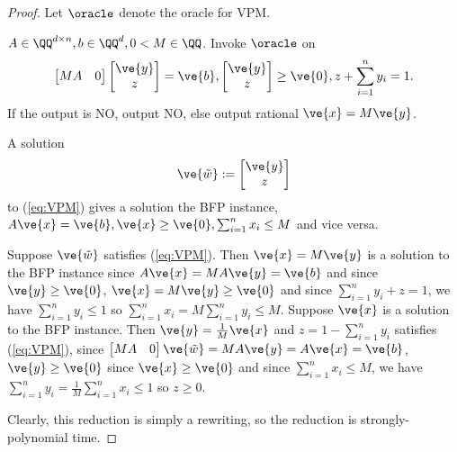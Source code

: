 \begin{proof}
Let $\oracle$ denote the oracle for VPM.
\begin{algorithmic}
\Require $A \in \QQ^{d \times n}, b \in \QQ^{d}, 0 < M \in \QQ$.
\State Invoke $\oracle$ on 
\begin{equation}\label{eq:VPM}
    \begin{bmatrix} MA & 0 \end{bmatrix} \begin{bmatrix} \ve{y} \\ z \end{bmatrix} = \ve{b}, \begin{bmatrix} \ve{y} \\ z \end{bmatrix} \ge \ve{0}, z + \sum_{i=1}^n y_i= 1.
\end{equation}  
If the output is NO, output NO, else output rational $\ve{x} = M\ve{y}$.
\end{algorithmic}

\begin{claim}
A solution 
$$
\ve{\tilde{w}} := \begin{bmatrix} \ve{y} \\ z \end{bmatrix}
$$ 
to (\ref{eq:VPM}) gives a solution the BFP instance, $A\ve{x}=\ve{b}, \ve{x} \ge \ve{0}, \sum_{i=1}^n x_i \le M$ and vice versa.
\end{claim}

\begin{claimproof} 
Suppose $\ve{\tilde{w}}$ satisfies (\ref{eq:VPM}).  
Then $\ve{x} = M\ve{y}$ is a solution to the BFP instance since $A\ve{x} = MA\ve{y} = \ve{b}$ and since $\ve{y} \ge \ve{0}$, $\ve{x} = M\ve{y} \ge \ve{0}$ and since $\sum_{i=1}^n y_i + z = 1$, we have $\sum_{i=1}^n y_i \le 1$ so $\sum_{i=1}^n x_i = M \sum_{i=1}^n y_i \le M$.  
Suppose $\ve{x}$ is a solution to the BFP instance.  
Then $\ve{y} = \frac{1}{M}\ve{x}$ and $z = 1 - \sum_{i=1}^n y_i$ satisfies (\ref{eq:VPM}), since $\begin{bmatrix} MA & 0 \end{bmatrix} \ve{\tilde{w}} = MA\ve{y} = A\ve{x} = \ve{b}$, $\ve{y} \ge \ve{0}$ since $\ve{x} \ge \ve{0}$ and since $\sum_{i=1}^n x_i \le M$, we have $\sum_{i=1}^n y_i = \frac{1}{M} \sum_{i=1}^n x_i \le 1$ so $z \ge 0$.
\end{claimproof}

Clearly, this reduction is simply a rewriting, so the reduction is strongly-polynomial time.
\end{proof}

